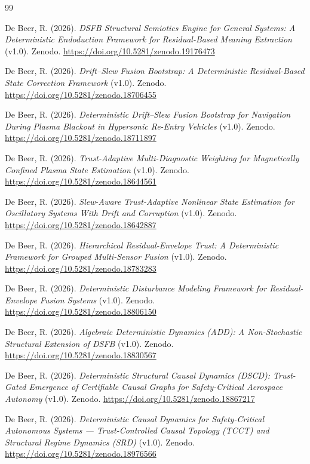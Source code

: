 \documentclass[11pt,letterpaper]{article}
\theoremstyle{gcresult}
\theoremstyle{definition}
\begin{document}
\begin{thebibliography}{99}



De Beer, R. (2026).
\textit{DSFB Structural Semiotics Engine for General Systems:
A Deterministic Endoduction Framework for Residual-Based Meaning Extraction}
(v1.0). Zenodo. \url{https://doi.org/10.5281/zenodo.19176473}

De Beer, R. (2026).
\textit{Drift--Slew Fusion Bootstrap: A Deterministic Residual-Based State
Correction Framework} (v1.0). Zenodo.
\url{https://doi.org/10.5281/zenodo.18706455}

De Beer, R. (2026).
\textit{Deterministic Drift--Slew Fusion Bootstrap for Navigation During Plasma
Blackout in Hypersonic Re-Entry Vehicles} (v1.0). Zenodo.
\url{https://doi.org/10.5281/zenodo.18711897}

De Beer, R. (2026).
\textit{Trust-Adaptive Multi-Diagnostic Weighting for Magnetically Confined
Plasma State Estimation} (v1.0). Zenodo.
\url{https://doi.org/10.5281/zenodo.18644561}

De Beer, R. (2026).
\textit{Slew-Aware Trust-Adaptive Nonlinear State Estimation for Oscillatory
Systems With Drift and Corruption} (v1.0). Zenodo.
\url{https://doi.org/10.5281/zenodo.18642887}

De Beer, R. (2026).
\textit{Hierarchical Residual-Envelope Trust: A Deterministic Framework for
Grouped Multi-Sensor Fusion} (v1.0). Zenodo.
\url{https://doi.org/10.5281/zenodo.18783283}

De Beer, R. (2026).
\textit{Deterministic Disturbance Modeling Framework for Residual-Envelope
Fusion Systems} (v1.0). Zenodo.
\url{https://doi.org/10.5281/zenodo.18806150}

De Beer, R. (2026).
\textit{Algebraic Deterministic Dynamics (ADD): A Non-Stochastic Structural
Extension of DSFB} (v1.0). Zenodo.
\url{https://doi.org/10.5281/zenodo.18830567}

De Beer, R. (2026).
\textit{Deterministic Structural Causal Dynamics (DSCD): Trust-Gated Emergence
of Certifiable Causal Graphs for Safety-Critical Aerospace Autonomy} (v1.0).
Zenodo. \url{https://doi.org/10.5281/zenodo.18867217}

De Beer, R. (2026).
\textit{Deterministic Causal Dynamics for Safety-Critical Autonomous Systems ---
Trust-Controlled Causal Topology (TCCT) and Structural Regime Dynamics (SRD)}
(v1.0). Zenodo. \url{https://doi.org/10.5281/zenodo.18976566}


\end{thebibliography}
\end{document}
